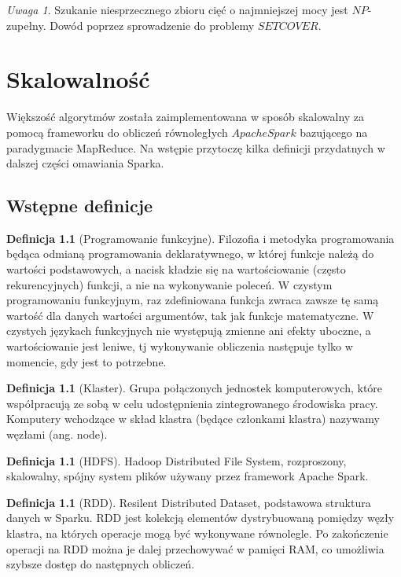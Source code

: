 \documentclass[magisterska]{pracamgr}
\theoremstyle{plain}
\theoremstyle{definition}
\newtheorem{definicja}[thm]{Definicja}
\theoremstyle{remark}
\newtheorem{uwaga}[thm]{Uwaga}
\begin{document}
\begin{uwaga}
Szukanie niesprzecznego zbioru cięć o najmniejszej mocy jest $NP$-zupełny.
Dowód poprzez sprowadzenie do problemy $SET COVER$.
\end{uwaga}


\chapter{Skalowalność}

Większość algorytmów została zaimplementowana w sposób skalowalny za pomocą frameworku 
do obliczeń równoległych $Apache Spark$ bazującego na paradygmacie MapReduce.
Na wstępie przytoczę kilka definicji przydatnych w dalszej części omawiania Sparka.

\section{Wstępne definicje}
\begin{definicja}[Programowanie funkcyjne]
Filozofia i metodyka programowania będąca odmianą programowania deklaratywnego, 
w której funkcje należą do wartości podstawowych, a nacisk kładzie się na wartościowanie 
(często rekurencyjnych) funkcji, a nie na wykonywanie poleceń.
W czystym programowaniu funkcyjnym, raz zdefiniowana funkcja zwraca zawsze 
tę samą wartość dla danych wartości argumentów, tak jak funkcje matematyczne.
W czystych językach funkcyjnych nie występują zmienne ani efekty uboczne, 
a wartościowanie jest leniwe, tj wykonywanie obliczenia następuje tylko w momencie, gdy jest to potrzebne.
\end{definicja}

\begin{definicja}[Klaster]
Grupa połączonych jednostek komputerowych, które współpracują ze sobą w celu udostępnienia zintegrowanego środowiska pracy.
Komputery wchodzące w skład klastra (będące członkami klastra) nazywamy węzłami (ang. node).
\end{definicja}

\begin{definicja}[HDFS]
Hadoop Distributed File System, rozproszony, skalowalny, spójny system plików używany przez framework Apache Spark.
\end{definicja}

\begin{definicja}[RDD]
Resilent Distributed Dataset, podstawowa struktura danych w Sparku. RDD jest kolekcją elementów dystrybuowaną pomiędzy 
węzły klastra, na których operacje mogą być wykonywane równolegle. Po zakończenie operacji na RDD można je dalej 
przechowywać w pamięci RAM, co umożliwia szybsze dostęp do następnych obliczeń. 
\end{definicja}
\end{document}
